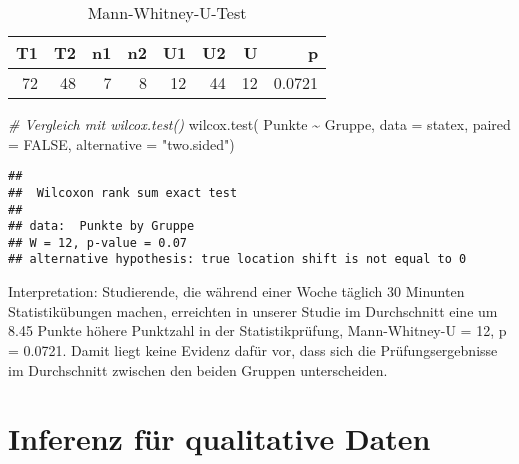 \documentclass[
]{book}
\newenvironment{Shaded}{\begin{snugshade}}{\end{snugshade}}
\newcommand{\AttributeTok}[1]{\textcolor[rgb]{0.77,0.63,0.00}{#1}}
\newcommand{\CommentTok}[1]{\textcolor[rgb]{0.56,0.35,0.01}{\textit{#1}}}
\newcommand{\ConstantTok}[1]{\textcolor[rgb]{0.00,0.00,0.00}{#1}}
\newcommand{\FunctionTok}[1]{\textcolor[rgb]{0.00,0.00,0.00}{#1}}
\newcommand{\NormalTok}[1]{#1}
\newcommand{\SpecialCharTok}[1]{\textcolor[rgb]{0.00,0.00,0.00}{#1}}
\newcommand{\StringTok}[1]{\textcolor[rgb]{0.31,0.60,0.02}{#1}}
\begin{document}
\begin{table}

\caption{\label{tab:data-statex}Mann-Whitney-U-Test}
\centering
\begin{tabular}[t]{r|r|r|r|r|r|r|r}
\hline
T1 & T2 & n1 & n2 & U1 & U2 & U & p\\
\hline
72 & 48 & 7 & 8 & 12 & 44 & 12 & 0.0721\\
\hline
\end{tabular}
\end{table}

\begin{Shaded}
\begin{Highlighting}[]
\CommentTok{\# Vergleich mit wilcox.test()}
\FunctionTok{wilcox.test}\NormalTok{(}
\NormalTok{  Punkte }\SpecialCharTok{\textasciitilde{}}\NormalTok{ Gruppe, }\AttributeTok{data =}\NormalTok{ statex, }
  \AttributeTok{paired =} \ConstantTok{FALSE}\NormalTok{, }
  \AttributeTok{alternative =} \StringTok{"two.sided"}\NormalTok{)}
\end{Highlighting}
\end{Shaded}

\begin{verbatim}
## 
##  Wilcoxon rank sum exact test
## 
## data:  Punkte by Gruppe
## W = 12, p-value = 0.07
## alternative hypothesis: true location shift is not equal to 0
\end{verbatim}

Interpretation: Studierende, die während einer Woche täglich 30 Minunten Statistikübungen machen, erreichten in unserer Studie im Durchschnitt eine um 8.45 Punkte höhere Punktzahl in der Statistikprüfung, Mann-Whitney-U = 12, p = 0.0721. Damit liegt keine Evidenz dafür vor, dass sich die Prüfungsergebnisse im Durchschnitt zwischen den beiden Gruppen unterscheiden.

\hypertarget{inferenz-fuxfcr-qualitative-daten}{%
\chapter{Inferenz für qualitative Daten}\label{inferenz-fuxfcr-qualitative-daten}}

  
\end{document}
